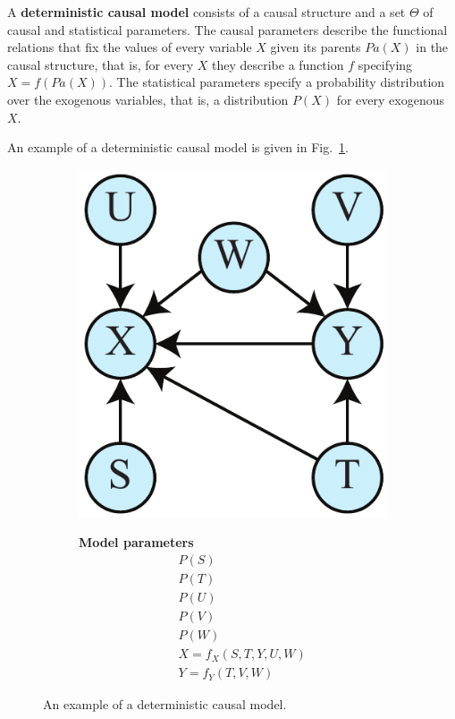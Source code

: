 \documentclass[12pt,onecolumn,nofootinbib]{revtex4-2}
\begin{document}
A \textbf{deterministic causal model} consists of a causal structure and a set $\Theta$ of
causal and statistical parameters.  The causal parameters describe the functional relations that fix the
values of every variable $X$ given its parents $Pa(X)$ in the causal structure, that is, for every $X$ they describe a function $f$ specifying $X=f(Pa(X))$.  The statistical parameters specify a probability distribution over the exogenous variables, that is, a distribution $P(X)$ for every exogenous $X$.

An example of a deterministic causal model is given in Fig.~\ref{fig:detSTAB-graph}.

\begin{figure}[tbp]
	\begin{subfigure}[b]{0.2\textwidth}
		\centering
  		\includegraphics[width=\textwidth]{det-stab-graph}
	\end{subfigure}
	\quad
	\begin{subfigure}[b]{0.2\textwidth}
		\textbf{Model parameters}
		\begin{eqnarray*}
			&&P(S)\\
			&&P(T)\\
			&&P(U)\\
			&&P(V)\\
			&&P(W)\\
			&&X= f_X(S,T,Y,U,W)\\
			&&Y= f_Y(T,V,W)
		\end{eqnarray*}
	\end{subfigure}
\caption{An example of a deterministic causal model.}
\label{fig:detSTAB-graph}
\end{figure}
\end{document}

